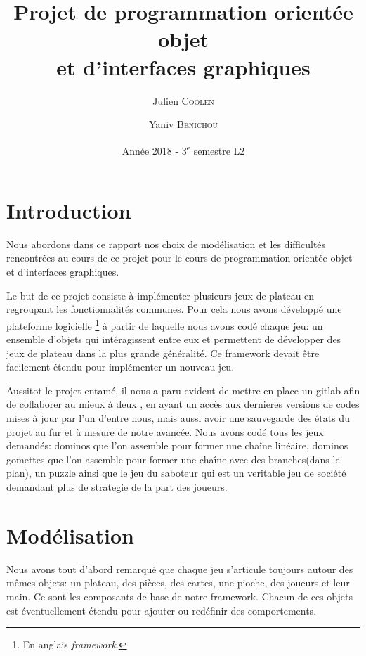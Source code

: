\documentclass[a4paper, 11pt, DIV=9]{scrartcl}
\title{Projet de programmation orientée objet \\ et d'interfaces graphiques}
\author{Julien \textsc{Coolen} \and Yaniv \textsc{Benichou}}
\date{Année 2018 - 3\textsuperscript{e} semestre L2}
\begin{document}
\maketitle

\section{Introduction}

Nous abordons dans ce rapport nos choix de modélisation et
les difficultés rencontrées au cours de ce projet pour le cours de
programmation orientée objet et d’interfaces graphiques.

Le but de ce projet consiste à implémenter plusieurs jeux de
plateau en regroupant les fonctionnalités communes. Pour cela
nous avons développé une plateforme logicielle \footnote{En anglais \textit{framework}.} à partir
de laquelle nous avons codé chaque jeu: un ensemble d'objets qui intéragissent
entre eux et permettent de développer des jeux de plateau dans la plus grande
généralité. Ce framework devait être facilement étendu pour implémenter un
nouveau jeu.

Aussitot le projet entamé, il nous a paru evident de mettre en place un gitlab afin de collaborer 
au mieux à deux , en ayant un accès aux dernieres versions de codes mises à jour par l'un d'entre nous,
mais aussi avoir une sauvegarde des états du projet au fur et à mesure de notre avancée.
Nous avons codé tous les jeux demandés: dominos que l'on assemble pour former
une chaîne linéaire, dominos gomettes que l'on assemble pour former une chaîne avec des
branches(dans le plan), un puzzle ainsi que le jeu du saboteur qui est un veritable jeu de 
société demandant plus de strategie de la part des joueurs.


\section{Modélisation}

Nous avons tout d'abord remarqué que chaque jeu s'articule toujours autour des mêmes objets:
un plateau, des pièces, des cartes, une pioche, des joueurs et leur main.
Ce sont les composants de base de notre framework. Chacun de ces objets est
éventuellement étendu pour ajouter ou redéfinir des comportements.
\end{document}
